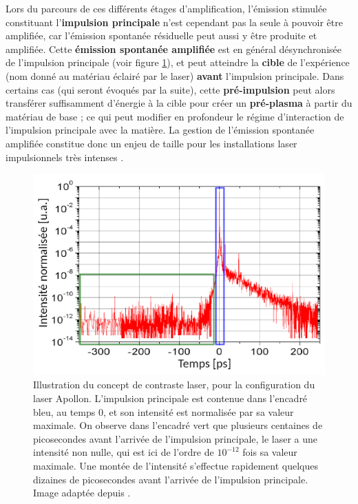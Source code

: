 \begin{refsection}
Lors du parcours de ces différents étages d'amplification, l'émission stimulée constituant l'\textbf{impulsion principale} n'est cependant pas la seule à pouvoir être amplifiée, car l'émission spontanée résiduelle peut aussi y être produite et amplifiée. Cette \textbf{émission spontanée amplifiée} est en général désynchronisée de l'impulsion principale (voir figure \ref{fig:2-contraste_laser}), et peut atteindre la \textbf{cible} de l'expérience (nom donné au matériau éclairé par le laser) \textbf{avant} l'impulsion principale. Dans certains cas (qui seront évoqués par la suite), cette \textbf{pré-impulsion} peut alors transférer suffisamment d'énergie à la cible pour créer un \textbf{pré-plasma} à partir du matériau de base ; ce qui peut modifier en profondeur le régime d'interaction de l'impulsion principale avec la matière. La gestion de l'émission spontanée amplifiée constitue donc un enjeu de taille pour les installations laser impulsionnels très intenses \parencite{papadopoulos_2017, kapteyn_1991, thaury_2007}. 

\begin{figure}[htbp]
    \centering
    \includegraphics[width=0.7\linewidth]{2-laser/contraste_laser_Papadopoulos.png}
    \caption{Illustration du concept de contraste laser, pour la configuration du laser Apollon. L'impulsion principale est contenue dans l'encadré bleu, au temps 0, et son intensité est normalisée par sa valeur maximale. On observe dans l'encadré vert que plusieurs centaines de picosecondes avant l'arrivée de l'impulsion principale, le laser a une intensité non nulle, qui est ici de l'ordre de $10^{-12}$ fois sa valeur maximale. Une montée de l'intensité s'effectue rapidement quelques dizaines de picosecondes avant l'arrivée de l'impulsion principale. Image adaptée depuis \parencite{papadopoulos_2017}.}
    \label{fig:2-contraste_laser}
\end{figure}


\end{refsection}
